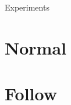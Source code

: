 \section{}
    \begin{frame}[allowframebreaks]{Experiments}
        \section{Normal}
        
        
        \section{Follow}
    \end{frame}
    
    \subsection{}
        
        